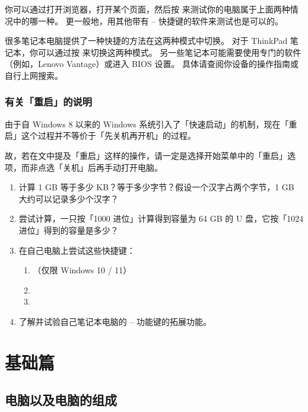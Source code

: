 \documentclass[a4paper]{book}
\begin{document}
你可以通过打开浏览器，打开某个页面，然后按  来测试你的电脑属于上面两种情况中的哪一种。
更一般地，用其他带有  --  快捷键的软件来测试也是可以的。

很多笔记本电脑提供了一种快捷的方法在这两种模式中切换。
对于 ThinkPad 笔记本，你可以通过按  来切换这两种模式。
另一些笔记本可能需要使用专门的软件（例如，Lenovo Vantage）或进入 BIOS 设置。
具体请查阅你设备的操作指南或自行上网搜索。

\section{有关「重启」的说明}

由于自 Windows 8 以来的 Windows 系统引入了「快速启动」的机制，现在「重启」这个过程并不等价于「先关机再开机」的过程。

故，若在文中提及「重启」这样的操作，请一定是选择开始菜单中的「重启」选项，而非点选「关机」后再手动打开电脑。

\practice

\begin{enumerate}
  \item 计算 1 GB 等于多少 KB？等于多少字节？假设一个汉字占两个字节，1 GB 大约可以记录多少个汉字？
  \item 尝试计算，一只按「1000 进位」计算得到容量为 64 GB 的 U 盘，它按「1024 进位」得到的容量是多少？
  \item 在自己电脑上尝试这些快捷键：
    \begin{enumerate}
      \item {} （仅限 Windows 10 / 11）
      \item {}
      \item {}
    \end{enumerate}
  \item 了解并试验自己笔记本电脑的  --  功能键的拓展功能。
\end{enumerate}

\part{基础篇}

\chapter{电脑以及电脑的组成}
\end{document}
